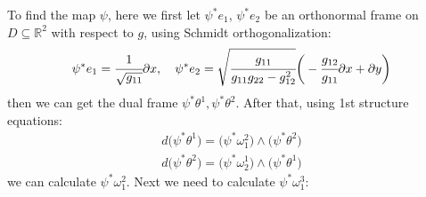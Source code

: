 \documentclass[10pt]{article}
\begin{document}
            To find the map $\psi$, here we first let $\psi^*e_1$, $\psi^*e_2$ be an orthonormal frame on $D\subseteq\mathbb{R}^2$ with respect to $g$, using Schmidt orthogonalization:
            \begin{equation*}
                \begin{aligned}
                    \psi^*e_1 = \cfrac{1}{\sqrt{g_{11}}}\partial x,\quad \psi^*e_2 = \sqrt{\cfrac{g_{11}}{g_{11}g_{22}-g_{12}^2}}\bigg(-\cfrac{g_{12}}{g_{11}}\partial x + \partial y\bigg)
                \end{aligned}
            \end{equation*}
            then we can get the dual frame $\psi^*\theta^1, \psi^*\theta^2$. After that, using 1st structure equations:
            \begin{equation*}
                \begin{aligned}
                    d\big(\psi^*\theta^1\big) = \big(\psi^*\omega_1^2\big)\wedge\big(\psi^*\theta^2\big) \\
                    d\big(\psi^*\theta^2\big) = \big(\psi^*\omega_2^1\big)\wedge\big(\psi^*\theta^1\big)
                \end{aligned}
            \end{equation*}
            we can calculate $\psi^*\omega_1^2$. Next we need to calculate $\psi^*\omega_1^3$:
\end{document}
